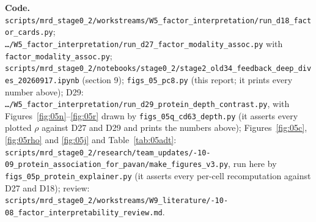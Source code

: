 {\textbf{Code.} \texttt{scripts/\allowbreak mrd\_stage0\_2/\allowbreak workstreams/\allowbreak W5\_factor\_\allowbreak interpretation/\allowbreak run\_d18\_\allowbreak factor\_cards.py}; \texttt{\ldots/\allowbreak W5\_factor\_\allowbreak interpretation/\allowbreak run\_d27\_\allowbreak factor\_\allowbreak modality\_\allowbreak assoc.py} with \texttt{factor\_\allowbreak modality\_\allowbreak assoc.py}; \texttt{scripts/\allowbreak mrd\_stage0\_2/\allowbreak notebooks/\allowbreak stage0\_2/\allowbreak stage2\_old34\_\allowbreak feedback\_\allowbreak deep\_dives\_\allowbreak 20260917.ipynb} (section 9); \texttt{figs\_05\_pc8.py} (this report; it prints every number above); D29: \texttt{\ldots/\allowbreak W5\_factor\_\allowbreak interpretation/\allowbreak run\_d29\_\allowbreak protein\_\allowbreak depth\_\allowbreak contrast.py}, with Figures~\ref{fig:05n}--\ref{fig:05r} drawn by \texttt{figs\_05q\_\allowbreak cd63\_\allowbreak depth.py} (it asserts every plotted $\rho$ against D27 and D29 and prints the numbers above); Figures~\ref{fig:05c}, \ref{fig:05rho} and \ref{fig:05j} and Table~\ref{tab:05adt}: \texttt{scripts/\allowbreak mrd\_stage0\_2/\allowbreak research/\allowbreak team\_updates/-10-09\_protein\_\allowbreak association\_\allowbreak for\_pavan/\allowbreak make\_figures\_v3.py}, run here by \texttt{figs\_05p\_\allowbreak protein\_\allowbreak explainer.py} (it asserts every per-cell recomputation against D27 and D18); review: \texttt{scripts/\allowbreak mrd\_stage0\_2/\allowbreak workstreams/\allowbreak W9\_literature/-10-08\_factor\_\allowbreak interpretability\_\allowbreak review.md}.

\par}
